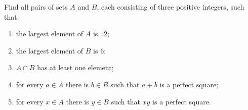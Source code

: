 Find all pairs of sets $A$ and $B$, each consisting of three positive integers, such that:
\begin{enumerate}
\item[(i)] the largest element of $A$ is $12$;
\item[(ii)] the largest element of $B$ is $6$;
\item[(iii)] $A\cap B$ has at least one element;
\item[(iv)] for every $a\in A$ there is $b\in B$ such that $a+b$ is a perfect square;
\item[(v)] for every $x\in A$ there is $y\in B$ such that $xy$ is a perfect square.
\end{enumerate}
